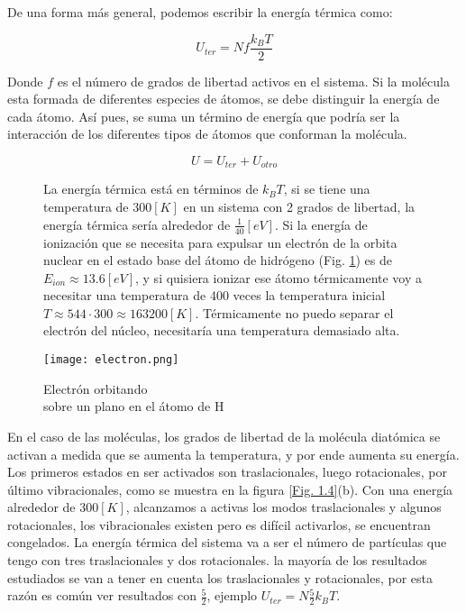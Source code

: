 \documentclass[11pt,fleqn]{book}
\begin{document}
De una forma más general, podemos escribir la energía térmica como:

\begin{equation}
    U_{ter}=Nf\frac{k_{B}T}{2}
    \label{Eq. 1.9}
\end{equation}

Donde $f$ es el número de grados de libertad activos en el sistema. Si la molécula esta formada de diferentes especies de átomos, se debe distinguir la energía de cada átomo. Así pues, se suma un término de energía que podría ser la interacción de los diferentes tipos de átomos que conforman la molécula.

\begin{equation*}
    U=U_{ter}+U_{otro}
\end{equation*}

\begin{figure}[H]
    \begin{minipage}[c]{0.6\linewidth}
    \hspace{5mm} La energía térmica está en términos de $k_{B}T$, si se tiene una temperatura de $300[K]$ en un sistema con 2 grados de libertad, la energía térmica sería alrededor de $\frac{1}{40}[eV]$. Si la energía de ionización que se necesita para expulsar un electrón de la  orbita nuclear en el estado base del átomo de hidrógeno (Fig. \ref{Fig. 1.3}) es de $E_{ion}\approx13.6 [eV]$, y si quisiera ionizar ese átomo térmicamente voy a necesitar una temperatura de 400 veces la temperatura inicial $T\approx544\cdot300\approx163200[K]$. Térmicamente no puedo separar el electrón del núcleo, necesitaría una temperatura demasiado alta. 
    \end{minipage}\hspace{7mm}
    \begin{minipage}[c]{0.5\linewidth}
    \texttt{[image: electron.png]}
    \caption{Electrón orbitando\\ sobre un plano en el átomo de H}
    \label{Fig. 1.3}
    \end{minipage}
\end{figure}
\vspace{-5mm} 

En  el caso de las moléculas, los grados de libertad de la molécula diatómica se activan a medida que se aumenta la temperatura, y por ende aumenta su energía. Los primeros estados en ser activados son traslacionales, luego rotacionales, por último vibracionales, como se muestra en la figura \ref{Fig. 1.4}(b). Con una energía alrededor de $300 [K]$, alcanzamos a activas los modos traslacionales y algunos rotacionales, los vibracionales existen pero es difícil activarlos, se encuentran congelados. La energía térmica del sistema va a ser el número de partículas que tengo con tres traslacionales y dos rotacionales. la mayoría de los resultados estudiados se van a tener en cuenta los traslacionales y rotacionales, por esta razón es común ver resultados con $\frac{5}{2}$, ejemplo $U_{ter}=N\frac{5}{2}k_{B}T$. 
\end{document}

